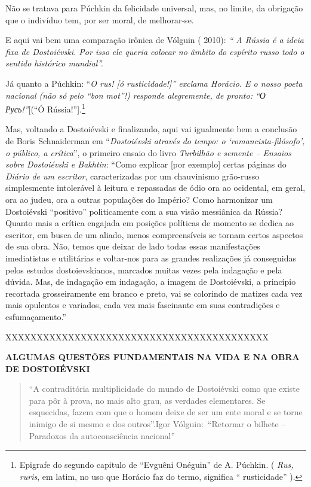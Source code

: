 Não se tratava para Púchkin da felicidade universal, mas, no limite, da
obrigação que o indivíduo tem, por ser moral, de melhorar-se.

E aqui vai bem uma comparação irônica de Vólguin ( 2010): \emph{`` A
Rússia é a ideia fixa de Dostoiévski. Por isso ele queria colocar no
âmbito do espírito russo todo o sentido histórico mundial''.}

Já quanto a Púchkin: ``\emph{O rus! {[}ó rusticidade!{]}'' exclama
Horácio. E o nosso poeta nacional (não só pelo ``bon mot''!) responde
alegremente, de pronto: ``О Русь!''}{[}(``Ó Rússia!''{]}.\footnote{Epigrafe
  do segundo capitulo de ``Evguêni Onéguin'' de A. Púchkin. ( \emph{Rus,
  ruris}, em latim, no uso que Horácio faz do termo, significa ``
  rusticidade'' ).}

Mas, voltando a Dostoiévski e finalizando, aqui vai igualmente bem a
conclusão de Boris Schnaiderman em ``\emph{Dostoiévski através do tempo:
o `romancista-filósofo', o público, a crítica}'', o primeiro ensaio do
livro \emph{Turbilhão e semente -- Ensaios sobre Dostoiévski e Bakhtin}:
``Como explicar {[}por exemplo{]} certas páginas do \emph{Diário de um
escritor}, caracterizadas por um chauvinismo grão-russo simplesmente
intolerável à leitura e repassadas de ódio ora ao ocidental, em geral,
ora ao judeu, ora a outras populações do Império? Como harmonizar um
Dostoiévski ``positivo'' politicamente com a sua visão messiânica da
Rússia? Quanto mais a crítica engajada em posições políticas de momento
se dedica ao escritor, em busca de um aliado, menos compreensíveis se
tornam certos aspectos de sua obra. Não, temos que deixar de lado todas
essas manifestações imediatistas e utilitárias e voltar-nos para as
grandes realizações já conseguidas pelos estudos dostoievskianos,
marcados muitas vezes pela indagação e pela dúvida. Mas, de indagação em
indagação, a imagem de Dostoiévski, a princípio recortada grosseiramente
em branco e preto, vai se colorindo de matizes cada vez mais opulentos e
variados, cada vez mais fascinante em suas contradições e
esfumaçamento.''

XXXXXXXXXXXXXXXXXXXXXXXXXXXXXXXXXXXXXXXXXX

\textbf{ALGUMAS QUESTÕES FUNDAMENTAIS NA VIDA E NA OBRA DE DOSTOIÉVSKI}

\begin{quote}
``A contraditória multiplicidade do mundo de Dostoiévski como que existe
para pôr à prova, no mais alto grau, as verdades elementares. Se
esquecidas, fazem com que o homem deixe de ser um ente moral e se torne
inimigo de si mesmo e dos outros''.Igor Vólguin:~``Retornar o bilhete --
Paradoxos da autoconsciência nacional''~
\end{quote}

